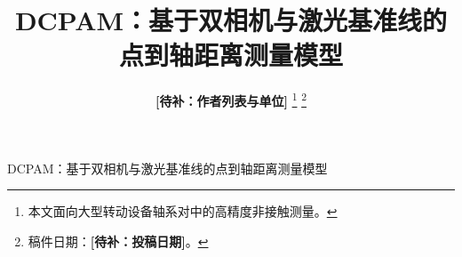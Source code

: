 \documentclass[journal]{IEEEtran}
\newcommand{\todo}[1]{{\bfseries[待补：#1]}}
\begin{document}
\title{DCPAM：基于双相机与激光基准线的\\
点到轴距离测量模型}

\author{\todo{作者列表与单位}
\thanks{本文面向大型转动设备轴系对中的高精度非接触测量。}%
\thanks{稿件日期：\todo{投稿日期}。}}

%
{DCPAM：基于双相机与激光基准线的点到轴距离测量模型}

\maketitle










\end{document}
